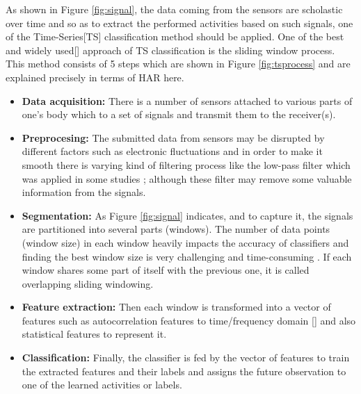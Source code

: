 As shown in Figure \ref{fig:signal}, the data coming from the sensors 
are scholastic over time and so as to extract the performed activities 
based on such signals, one of the Time-Series[TS] classification method 
should be applied. One of the best and widely used[] approach of TS 
classification is the sliding window process. This method consists of 5 
steps which are shown in Figure \ref{fig:tsprocess} and are explained 
precisely in terms of HAR here.
\begin{itemize}
\item \textbf{Data acquisition:} There is a number of sensors attached 
to various parts of one's body which  to a set of signals and transmit them to the 
receiver(s). 
\item \textbf{Preprocesing:} The submitted data from sensors may be 
disrupted by different factors such as electronic fluctuations and in 
order to make it smooth there is varying kind of filtering process like 
the low-pass filter which was applied in some studies 
\cite{morris2014recofit}; although these filter may remove some 
valuable information from the signals.   
\item \textbf{Segmentation:} As Figure \ref{fig:signal} indicates, 
 and to capture it, the signals 
are partitioned into several parts (windows). The number of data points 
(window size) in each window heavily impacts the accuracy of 
classifiers  and finding the best window size is very challenging and 
time-consuming . If each window shares some part of itself with the 
previous one, it is called overlapping sliding windowing.  

\item \textbf{Feature extraction:} Then each window is transformed into 
a vector of features such as autocorrelation features 
\cite{morris2014recofit} to time/frequency domain [] and also 
statistical features to represent it.  
\item \textbf{Classification:} Finally, the classifier 
is fed by the vector of features to train the extracted features and 
their labels and assigns the future observation to one of the learned 
activities or labels. 


\end{itemize}

